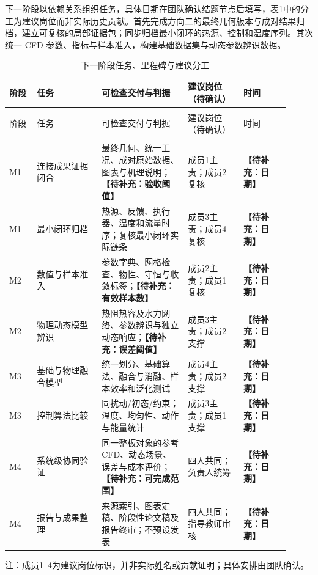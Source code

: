 \documentclass[stage2,UTF8,fontset=fandol]{ydzjreport}
\DeclareRobustCommand{\TBD}[1]{{\color{ydzjgrey}\textbf{【待补充：#1】}}}
\begin{document}
下一阶段以依赖关系组织任务，具体日期在团队确认结题节点后填写，表\ref{tab:16}中的分工为建议岗位而非实际历史贡献。首先完成方向二的最终几何版本与成对结果归档，建立可复核的局部证据包；同步归档最小闭环的热源、控制和温度序列。其次统一 CFD 参数、指标与样本准入，构建基础数据集与动态参数辨识数据。
\begingroup\small
\setlength{\tabcolsep}{4pt}
\begin{longtable}{>{\raggedright\arraybackslash}p{0.09\linewidth}>{\raggedright\arraybackslash}p{0.21\linewidth}>{\raggedright\arraybackslash}p{0.28\linewidth}>{\raggedright\arraybackslash}p{0.18\linewidth}>{\raggedright\arraybackslash}p{0.15\linewidth}}
\caption{下一阶段任务、里程碑与建议分工}\label{tab:16}\\
\toprule \rowcolor{ydzjlight} 阶段 & 任务 & 可检查交付与判据 & 建议岗位（待确认） & 时间 \\\midrule
\endfirsthead
\multicolumn{5}{l}{表\thetable\ 续：下一阶段研究计划}\\
\toprule \rowcolor{ydzjlight} 阶段 & 任务 & 可检查交付与判据 & 建议岗位（待确认） & 时间 \\\midrule
\endhead
\midrule\multicolumn{5}{r}{续下页}\\\endfoot
\bottomrule\endlastfoot
M1 & 连接成果证据闭合 & 最终几何、统一工况、成对原始数据、图表与机理说明；\TBD{验收阈值} & 成员1主责；成员2复核 & \TBD{日期}\\
M1 & 最小闭环归档 & 热源、反馈、执行器、温度和流量时序；复核最小闭环实际链条 & 成员3主责；成员4复核 & \TBD{日期}\\
M2 & 数值与样本准入 & 参数字典、网格检查、物性、守恒与收敛标签；\TBD{有效样本数} & 成员2主责；成员1复核 & \TBD{日期}\\
M2 & 物理动态模型辨识 & 热阻热容及水力网络、参数辨识与独立动态响应；\TBD{误差阈值} & 成员3主责；成员2支撑 & \TBD{日期}\\
M3 & 基础与物理融合模型 & 统一划分、基础算法、融合与消融、样本效率和泛化测试 & 成员4主责；成员2支撑 & \TBD{日期}\\
M3 & 控制算法比较 & 同扰动/初态/约束；温度、均匀性、动作与能量统计 & 成员3主责；成员1支撑 & \TBD{日期}\\
M4 & 系统级协同验证 & 同一整板对象的参考CFD、动态场景、误差与成本评价；\TBD{可完成范围} & 四人共同；负责人统筹 & \TBD{日期}\\
M4 & 报告与成果整理 & 来源索引、图表定稿、阶段性论文稿及报告终审；不预设发表 & 四人共同；指导教师审核 & \TBD{日期}\\
\end{longtable}
\endgroup
\noindent\footnotesize 注：成员1--4为建议岗位标识，并非实际姓名或贡献证明；具体安排由团队确认。\normalsize
\end{document}
